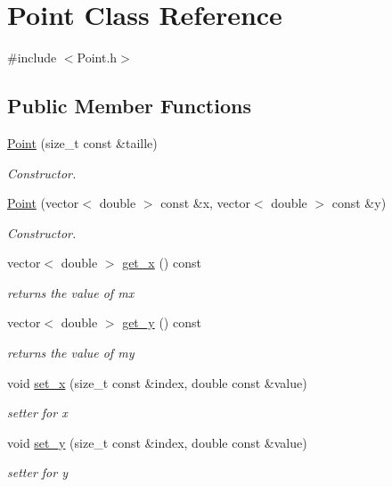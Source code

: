 \hypertarget{class_point}{}\section{Point Class Reference}
\label{class_point}


{\ttfamily \#include $<$Point.\+h$>$}

\subsection*{Public Member Functions}
\begin{DoxyCompactItemize}
\item 
\mbox{\hyperlink{class_point_a44d490126797f9e88de376fb6814b089}{Point}} (size\+\_\+t const \&taille)
\begin{DoxyCompactList}\small\item\em Constructor. \end{DoxyCompactList}\item 
\mbox{\hyperlink{class_point_a64da1fdafc9131972f1458ef9bd5de30}{Point}} (vector$<$ double $>$ const \&x, vector$<$ double $>$ const \&y)
\begin{DoxyCompactList}\small\item\em Constructor. \end{DoxyCompactList}\item 
vector$<$ double $>$ \mbox{\hyperlink{class_point_a0badc8959ee9db08740cf22abcb8d8db}{get\+\_\+x}} () const
\begin{DoxyCompactList}\small\item\em returns the value of mx \end{DoxyCompactList}\item 
vector$<$ double $>$ \mbox{\hyperlink{class_point_a5d9ab69bfb09db813d543a8cd2fb24c7}{get\+\_\+y}} () const
\begin{DoxyCompactList}\small\item\em returns the value of my \end{DoxyCompactList}\item 
void \mbox{\hyperlink{class_point_a7a9b270860e9198583176ad5c42f9187}{set\+\_\+x}} (size\+\_\+t const \&index, double const \&value)
\begin{DoxyCompactList}\small\item\em setter for x \end{DoxyCompactList}\item 
void \mbox{\hyperlink{class_point_a40f61acc21fc1416c2cc1034ee2a928a}{set\+\_\+y}} (size\+\_\+t const \&index, double const \&value)
\begin{DoxyCompactList}\small\item\em setter for y \end{DoxyCompactList}\end{DoxyCompactItemize}


